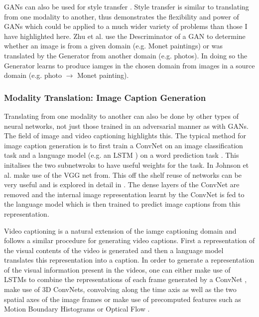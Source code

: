 GANs can also be used for style transfer \cite{zhu2017unpaired}. Style transfer is similar to translating from one modality to another, thus \cite{zhu2017unpaired} demonstrates the flexibility and power of \ac{GAN}s which could be applied to a much wider variety of problems than those I have highlighted here. Zhu et al. use the Descriminator of a \ac{GAN} to determine whether an image is from a given domain (e.g. Monet paintings) or was translated by the Generator from another domain (e.g. photos). In doing so the Generator learns to produce iamges in the chosen domain from images in a source domain (e.g. photo $\rightarrow$ Monet painting).

\subsubsection{Modality Translation: Image Caption Generation}
Translating from one modality to another can also be done by other types of neural networks, not just those trained in an adversarial manner as with \ac{GAN}s.
The field of image and video captioning highlights this. The typical method for image caption generation is to first train a ConvNet on an image classification task and a language model (e.g. an \ac{LSTM} \cite{hochreiter1997long}) on a word prediction task \cite{vinyals2015show, venugopalan2014translating, johnson2016densecap}. This initalises the two subnetwroks to have useful weights for the task. In \cite{johnson2016densecap} Johnson et al. make use of the VGG net from\cite{simonyan2014very}. This off the shelf reuse of networks can be very useful and is explored in detail in \cite{keller}.
The dense layers of the \ac{ConvNet} are removed and the internal image representation learnt by the \ac{ConvNet} is fed to the language model which is then trained to predict image captions from this representation.

Video captioning is a natural extension of the iamge captioning domain and follows a similar procedure for generating video captions. First a representation of the visual contents of the video is generated and then a language model translates this representation into a caption. In order to generate a representation of the visual information  present in the videos, one can either make use of \ac{LSTM}s to combine the representations of each frame generated by a \ac{ConvNet} \cite{donahue2015long}, make use of 3D \ac{ConvNet}s, convolving along the time axis as well as the two spatial axes of the image frames \cite{yao2015describing, yao2015video} or make use of precomputed features such as Motion Boundary Histograms or Optical Flow \cite{rohrbach2014coherent, rohrbach2013translating}.

